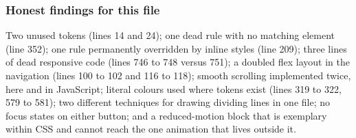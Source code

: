 \subsubsection*{Honest findings for this file}

Two unused tokens (lines 14 and 24); one dead rule with no matching element (line
352); one rule permanently overridden by inline styles (line 209); three lines of
dead responsive code (lines 746 to 748 versus 751); a doubled flex layout in the
navigation (lines 100 to 102 and 116 to 118); smooth scrolling implemented twice,
here and in JavaScript; literal colours used where tokens exist (lines 319 to 322,
579 to 581); two different techniques for drawing dividing lines in one file; no
focus states on either button; and a reduced-motion block that is exemplary within
CSS and cannot reach the one animation that lives outside it.
